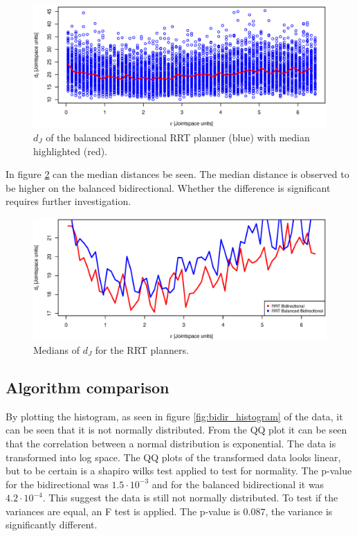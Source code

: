 \begin{figure}[h]
 \centering
 \includegraphics[width=\figsize]{graphics/balanced_correlation}
 \caption{\(d_J\) of the balanced bidirectional RRT planner (blue) with median highlighted (red).}
 \label{fig:balanced_correlated}
\end{figure}

In figure \ref{fig:medians} can the median distances be seen. 
The median distance is observed to be higher on the balanced bidirectional. 
Whether the difference is significant requires further investigation.

\begin{figure}[h]
 \centering
 \includegraphics[width=\figsize]{graphics/compare_distance}
 \caption{Medians of \(d_J\) for the RRT planners.}
 \label{fig:medians}
\end{figure}

\subsection{Algorithm comparison}

By plotting the histogram, as seen in figure \ref{fig:bidir_histogram} of the data, it can be seen that it is not normally distributed. 
From the QQ plot it can be seen that the correlation between a normal distribution is exponential.
The data is transformed into log space.
The QQ plots of the transformed data looks linear, but to be certain is a shapiro wilks test applied to test for normality.
The p-value for the bidirectional was \(1.5\cdot10^{-3}\) and for the balanced bidirectional it was \(4.2\cdot10^{-4}\).
This suggest the data is still not normally distributed.
To test if the variances are equal, an F test is applied.
The p-value is  \(0.087\), the variance is significantly different.


